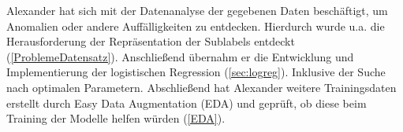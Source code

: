 Alexander hat sich mit der Datenanalyse der gegebenen Daten beschäftigt, um Anomalien oder andere Auffälligkeiten zu entdecken. Hierdurch wurde u.a. die Herausforderung der Repräsentation der Sublabels entdeckt  (\ref{ProblemeDatensatz}). Anschließend übernahm er die Entwicklung und Implementierung der logistischen Regression (\ref{sec:logreg}). Inklusive der Suche nach optimalen Parametern. Abschließend hat Alexander weitere Trainingsdaten erstellt durch Easy Data Augmentation (EDA) und geprüft, ob diese beim Training der Modelle helfen würden (\ref{EDA}).
